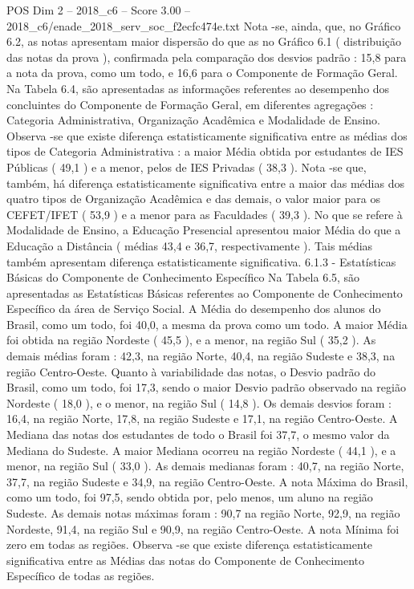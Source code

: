 \begin{textsample}{POS Dim 2 – 2018\_c6 – Score 3.00 – 2018\_c6/enade\_2018\_serv\_soc\_f2ecfc474e.txt}
Nota -se, ainda, que, no Gráfico 6.2, as notas apresentam maior dispersão do que as no Gráfico 6.1 ( distribuição das notas da prova ), confirmada pela comparação dos desvios padrão : 15,8 para a nota da prova, como um todo, e 16,6 para o Componente de Formação Geral.
Na Tabela 6.4, são apresentadas as informações referentes ao desempenho dos concluintes do Componente de Formação Geral, em diferentes agregações : Categoria Administrativa, Organização Acadêmica e Modalidade de Ensino.
Observa -se que existe diferença estatisticamente significativa entre as médias dos tipos de Categoria Administrativa : a maior Média obtida por estudantes de IES Públicas ( 49,1 ) e a menor, pelos de IES Privadas ( 38,3 ).
Nota -se que, também, há diferença estatisticamente significativa entre a maior das médias dos quatro tipos de Organização Acadêmica e das demais, o valor maior para os CEFET/IFET ( 53,9 ) e a menor para as Faculdades ( 39,3 ).
No que se refere à Modalidade de Ensino, a Educação Presencial apresentou maior Média do que a Educação a Distância ( médias 43,4 e 36,7, respectivamente ).
Tais médias também apresentam diferença estatisticamente significativa. 6.1.3 - Estatísticas Básicas do Componente de Conhecimento Específico Na Tabela 6.5, são apresentadas as Estatísticas Básicas referentes ao Componente de Conhecimento Específico da área de Serviço Social.
A Média do desempenho dos alunos do Brasil, como um todo, foi 40,0, a mesma da prova como um todo.
A maior Média foi obtida na região Nordeste ( 45,5 ), e a menor, na região Sul ( 35,2 ).
As demais médias foram : 42,3, na região Norte, 40,4, na região Sudeste e 38,3, na região Centro-Oeste.
Quanto à variabilidade das notas, o Desvio padrão do Brasil, como um todo, foi 17,3, sendo o maior Desvio padrão observado na região Nordeste ( 18,0 ), e o menor, na região Sul ( 14,8 ).
Os demais desvios foram : 16,4, na região Norte, 17,8, na região Sudeste e 17,1, na região Centro-Oeste.
A Mediana das notas dos estudantes de todo o Brasil foi 37,7, o mesmo valor da Mediana do Sudeste.
A maior Mediana ocorreu na região Nordeste ( 44,1 ), e a menor, na região Sul ( 33,0 ).
As demais medianas foram : 40,7, na região Norte, 37,7, na região Sudeste e 34,9, na região Centro-Oeste.
A nota Máxima do Brasil, como um todo, foi 97,5, sendo obtida por, pelo menos, um aluno na região Sudeste.
As demais notas máximas foram : 90,7 na região Norte, 92,9, na região Nordeste, 91,4, na região Sul e 90,9, na região Centro-Oeste.
A nota Mínima foi zero em todas as regiões.
Observa -se que existe diferença estatisticamente significativa entre as Médias das notas do Componente de Conhecimento Específico de todas as regiões.

\end{textsample}
